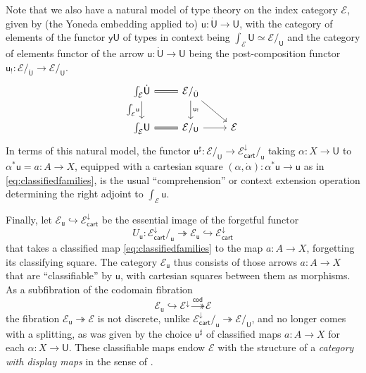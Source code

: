 \documentclass[12pt,reqno]{amsart}
\newcommand{\EE}{\ensuremath{\mathcal{E}}}
\newcommand{\y}{\ensuremath{\mathsf{y}}} %
\newcommand{\hook}{\ensuremath{\hookrightarrow}}
\renewcommand{\epi}{\ensuremath{\twoheadrightarrow}}
\renewcommand{\to}{\ensuremath{\rightarrow}}
\renewcommand{\u}{\ensuremath{\mathsf{u}}}
\renewcommand{\t}{\ensuremath{\mathsf{u}}}
\newcommand{\T}{\ensuremath{\mathsf{U}}}
\newcommand{\TT}{\ensuremath{\dot{\mathsf{U}}}}
\theoremstyle{remark}
\theoremstyle{definition}
\begin{document}
Note that we also have a natural model of type theory on the index category $\EE$, given by (the Yoneda embedding applied to) $\t: \TT \to \T$, with the category of elements of the functor $\y\T$ of types in context being $\int_{\EE}\!\T \simeq \EE/_\T$ and the category of elements functor of the arrow $\t: \TT \to \T$ being the post-composition functor $\t_{!} : \EE/_{\TT} \to \EE/_{\T}$.
 \begin{equation}\label{eq:sliceadjunctionelements}
\begin{tikzcd}
\int_{\EE}\!\TT \ar[d,swap, "{\int_{\EE}\!\t}"] \ar[r, equals] & \EE/_{\TT} \ar[d, "{\t_{!}}"] \ar[rd] & \\
 \int_{\EE}\!\T \ar[r,equals] &  \EE/_\T \ar[r] & \EE
 \end{tikzcd}
 \end{equation}
 In terms of this natural model, the functor $\t^{\sharp} : \EE/_\T \to \EE^{\downarrow}_{\mathsf{cart}}/_{\t}$ taking $\alpha : X \to \T$ to $\alpha^*\t = a: A \to X$, equipped with a cartesian square $(\alpha, \dot{\alpha}) : \alpha^*\t \to \t$ as in \eqref{eq:classifiedfamilies}, is the usual ``comprehension'' or context extension operation determining the right adjoint to $\int_{\EE}\!\t$.
 
Finally, let $\EE_\t \hook  \EE^{\downarrow}_{\mathsf{cart}}$ be the essential image of the forgetful functor 
\[
U_\t :  \EE^{\downarrow}_{\mathsf{cart}}/_{\t} \twoheadrightarrow \EE_\t \hook \EE^{\downarrow}_{\mathsf{cart}}
\]
that takes a classified map \eqref{eq:classifiedfamilies} to the map $a : A \to X$, forgetting its classifying square.  
The category $\EE_\t$ thus consists of those arrows $a:A \to X$ that are ``classifiable'' by $\t$, with cartesian squares between them as morphisms. As a subfibration of the codomain fibration 
\[
\EE_\t \hook \EE^\downarrow \stackrel{\mathsf{cod}}{\epi} \EE
\]
 the fibration $\EE_\t \epi \EE$ is not discrete, unlike $\EE^{\downarrow}_{\mathsf{cart}}/_{\t} \twoheadrightarrow \EE/_\T$, and no longer comes with a splitting, as was given by the choice $\u^\sharp$ of classified maps $a : A\to X$ for each $\alpha : X \to \T$.  These classifiable maps endow $\EE$ with the structure of a \emph{category with display maps} in the sense of \cite{Taylor:PFM}.  
\end{document}
